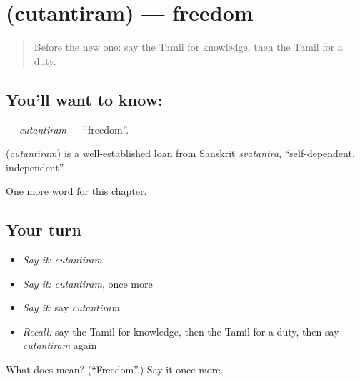 \section[\texorpdfstring{\ta{சுதந்திரம்} (cutantiram)}{சுதந்திரம் (cutantiram)}]{ (cutantiram) — freedom}

\label{lesson:TA-C208-cutantiram}



\begin{quote}
Before the new one: say the Tamil for knowledge, then the Tamil for a duty.
\end{quote}

\subsection*{You'll want to know: }
\textbf{} — \emph{cutantiram} — \textquotedblleft{}freedom\textquotedblright{}.

\begin{cousinweb}
\textbf{} (\emph{cutantiram}) is a well-established loan from Sanskrit \emph{svatantra}, \textquotedblleft{}self-dependent, independent\textquotedblright{}.
\end{cousinweb}

\begin{grammarlens}[title={What you've built}]
One more word for this chapter.
\end{grammarlens}

\subsection*{Your turn}
\begin{itemize}
\raggedright
  \item \emph{Say it:} \emph{cutantiram}
  \item \emph{Say it:} \emph{cutantiram}, once more
  \item \emph{Say it:} say \emph{cutantiram}
  \item \emph{Recall:} say the Tamil for knowledge, then the Tamil for a duty, then say \emph{cutantiram} again
\end{itemize}

\begin{tcolorbox}[breakable,colback=teal!4,colframe=teal!35!black,title={Before you move on}]
What does  mean? (\textquotedblleft{}Freedom\textquotedblright{}.) Say it once more.
\end{tcolorbox}
